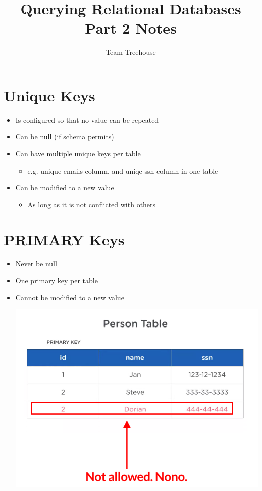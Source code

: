 \documentclass[12pt]{article}
\begin{document}
\title{Querying Relational Databases Part 2 Notes}
\author{Team Treehouse}
\maketitle

\bigskip

\section{Unique Keys}

\bigskip

\begin{itemize}
    \item Is configured so that no value can be repeated
    \item Can be null (if schema permits)
    \item Can have multiple unique keys per table
    \begin{itemize}
        \item e.g. unique emails column, and uniqe ssn column in one table
    \end{itemize}
    \item Can be modified to a new value
    \begin{itemize}
        \item As long as it is not conflicted with others
    \end{itemize}
\end{itemize}

\bigskip

\section{PRIMARY Keys}

\bigskip

\begin{itemize}
    \item Never be null
    \item One primary key per table
    \item Cannot be modified to a new value

    \begin{center}
    \includegraphics[width=0.7\linewidth]{images/part_2_notes_1.png}
    \end{center}
\end{itemize}
\end{document}
